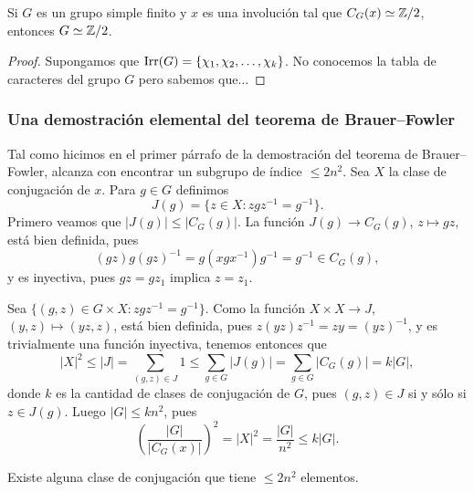 \begin{proposition}
Si $G$ es un grupo simple finito y $x$ es una involución tal que $C_G(x)\simeq\mathbb{Z}/2$, entonces
$G\simeq\mathbb{Z}/2$. 
\end{proposition}

\begin{proof}
Supongamos que $\operatorname{Irr}(G)=\{\chi_1,\chi_2,\dots,\chi_k\}$. No conocemos la tabla de caracteres del grupo $G$ 
pero sabemos que...
\end{proof}

\subsubsection*{Una demostración elemental del teorema de Brauer--Fowler}

Tal como hicimos en el primer párrafo de la demostración del teorema de Brauer--Fowler, alcanza con
encontrar un subgrupo de índice $\leq 2n^2$. 
Sea $X$ la clase de conjugación de $x$. Para $g\in G$ definimos
\[
J(g)=\{z\in X:zgz^{-1}=g^{-1}\}.
\]
Primero veamos que $|J(g)|\leq|C_G(g)|$. La función $J(g)\to C_G(g)$, $z\mapsto gz$, está bien definida, 
pues 
\[
(gz)g(gz)^{-1}=g(xgx^{-1})g^{-1}=g^{-1}\in C_G(g),
\]
y es inyectiva, pues $gz=gz_1$ implica $z=z_1$.

Sea $\{(g,z)\in G\times X:zgz^{-1}=g^{-1}\}$.  
Como la función $X\times X\to J$, $(y,z)\mapsto (yz,z)$, 
está bien definida, pues $z(yz)z^{-1}=zy=(yz)^{-1}$, y es trivialmente una función inyectiva, 
tenemos entonces que
\[
|X|^2\leq |J|=\sum_{(g,z)\in J}1\leq\sum_{g\in G}|J(g)|=\sum_{g\in G}|C_G(g)|=k|G|,
\]
donde $k$ es la cantidad de clases de conjugación de $G$, 
pues $(g,z)\in J$ si y sólo si $z\in J(g)$. Luego $|G|\leq kn^2$, pues
\[
\left(\frac{|G|}{|C_G(x)|}\right)^2=|X|^2=\frac{|G|}{n^2}\leq k|G|.
\]

\begin{claim}
Existe alguna clase de conjugación que tiene $\leq 2n^2$ elementos.
\end{claim}

